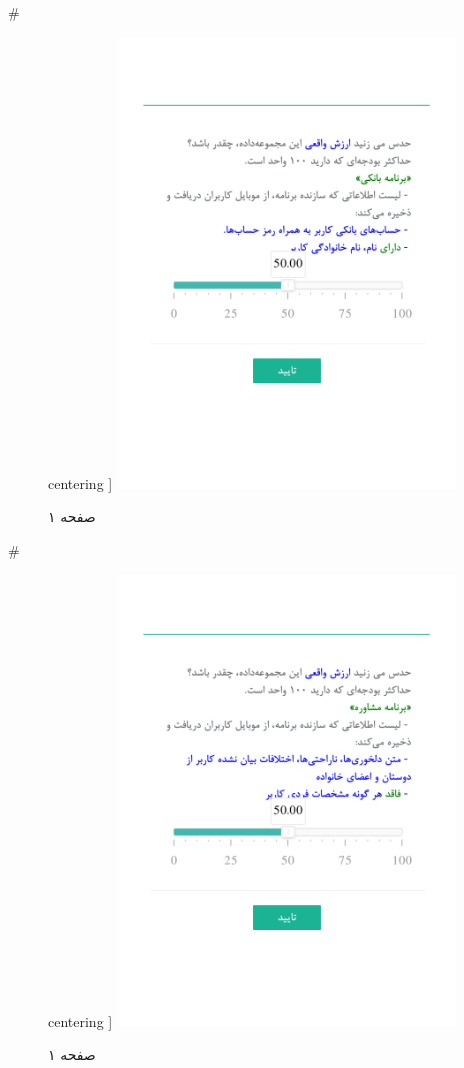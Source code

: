 { 
 # 
\begin{figure}[htpb]
centering ]
\includegraphics[width=0.8\textwidth]{./img/Task72.png/}
\caption{صفحه ۱}
\label{fig:Task1}
\end{figure}
 
 
 # 
\begin{figure}[htpb]
centering ]
\includegraphics[width=0.8\textwidth]{./img/Task73.png/}
\caption{صفحه ۱}
\label{fig:Task1}
\end{figure}
 
}
